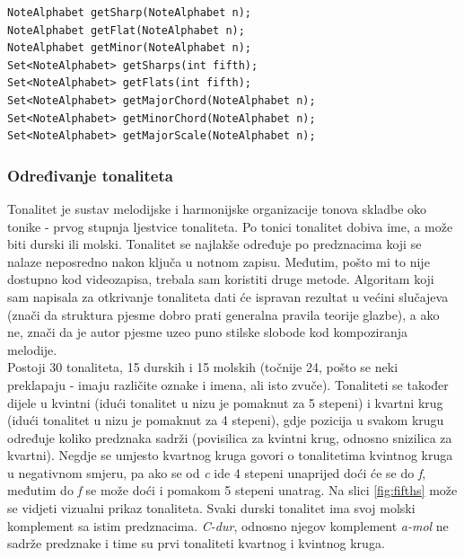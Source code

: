 \documentclass[times, utf8, zavrsni, numeric]{fer}
\begin{document}
\begin{lstlisting}
NoteAlphabet getSharp(NoteAlphabet n);
NoteAlphabet getFlat(NoteAlphabet n);
NoteAlphabet getMinor(NoteAlphabet n);
Set<NoteAlphabet> getSharps(int fifth);
Set<NoteAlphabet> getFlats(int fifth);
Set<NoteAlphabet> getMajorChord(NoteAlphabet n);
Set<NoteAlphabet> getMinorChord(NoteAlphabet n);
Set<NoteAlphabet> getMajorScale(NoteAlphabet n);
\end{lstlisting}

\subsubsection{Određivanje tonaliteta}
Tonalitet je sustav melodijske i harmonijske organizacije tonova skladbe oko tonike - prvog stupnja ljestvice tonaliteta. Po tonici tonalitet dobiva ime, a može biti durski ili molski\cite{tonalitet}. Tonalitet se najlakše određuje po predznacima koji se nalaze neposredno nakon ključa u notnom zapisu. Međutim, pošto mi to nije dostupno kod videozapisa, trebala sam koristiti druge metode. Algoritam koji sam napisala za otkrivanje tonaliteta dati će ispravan rezultat u većini slučajeva (znači da struktura pjesme dobro prati generalna pravila teorije glazbe), a ako ne, znači da je autor pjesme uzeo puno stilske slobode kod kompoziranja melodije.\\

Postoji 30 tonaliteta, 15 durskih i 15 molskih (točnije 24, pošto se neki preklapaju - imaju različite oznake i imena, ali isto zvuče). Tonaliteti se također dijele u kvintni (idući tonalitet u nizu je pomaknut za 5 stepeni) i kvartni krug (idući tonalitet u nizu je pomaknut za 4 stepeni), gdje pozicija u svakom krugu određuje koliko predznaka sadrži (povisilica za kvintni krug, odnosno snizilica za kvartni). Negdje se umjesto kvartnog kruga govori o tonalitetima kvintnog kruga u negativnom smjeru, pa ako se od \textit{c} ide 4 stepeni unaprijed doći će se do \textit{f}, međutim do \textit{f} se može doći i pomakom 5 stepeni unatrag. Na slici \ref{fig:fifths} može se vidjeti vizualni prikaz tonaliteta. Svaki durski tonalitet ima svoj molski komplement sa istim predznacima. \textit{C-dur}, odnosno njegov komplement \textit{a-mol} ne sadrže predznake i time su prvi tonaliteti kvartnog i kvintnog kruga.\\
\end{document}
